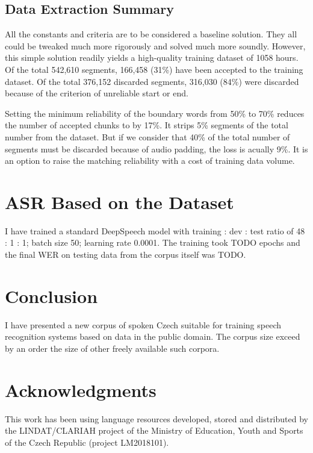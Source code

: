 \documentclass[runningheads,a4paper]{llncs}
\begin{document}
\subsection{Data Extraction Summary}

All the constants and criteria are to be considered a baseline solution. They
all could be tweaked much more rigorously and solved much more soundly. However,
this simple solution readily yields a high-quality training dataset of 1058
hours. Of the total 542,610 segments, 166,458 (31\%) have been accepted to the
training dataset. Of the total 376,152 discarded segments, 316,030 (84\%) were
discarded because of the criterion of unreliable start or end.

Setting the minimum reliability of the boundary words from 50\% to 70\% reduces
the number of accepted chunks to by 17\%. It strips 5\% segments
of the total number from the dataset. But if we consider that 40\% of the total
number of segments must be discarded because of audio padding, the loss is
acually 9\%. It is an option to raise the matching reliability with a cost of
training data volume.

\section{ASR Based on the Dataset}

I have trained a standard DeepSpeech\cite{hannun2014deep} model with training :
dev : test ratio of 48 : 1 : 1; batch size 50; learning rate 0.0001. The
training took TODO epochs and the final WER on testing data from the corpus
itself was TODO.

\section{Conclusion}

I have presented a new corpus of spoken Czech suitable for training speech
recognition systems based on data in the public domain. The corpus size exceed
by an order the size of other freely available such corpora.

\section*{Acknowledgments}

This work has been using language resources developed, stored and distributed by
the LINDAT/CLARIAH project of the Ministry of Education, Youth and Sports of the
Czech Republic (project LM2018101).




\end{document}
